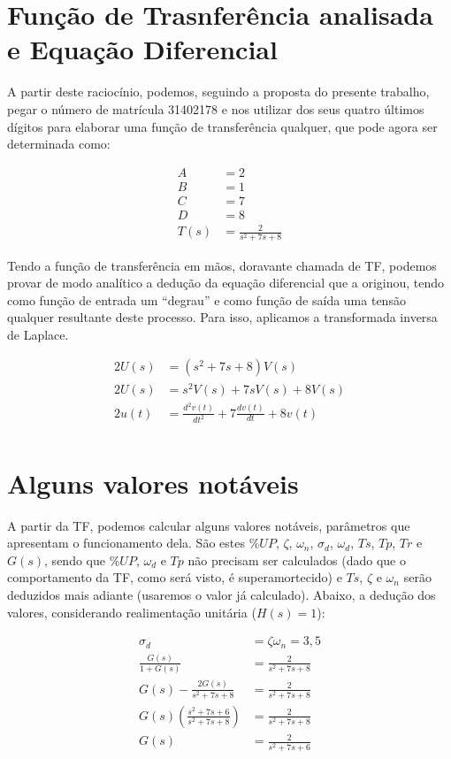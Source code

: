 \documentclass[
	article,			%
	11pt,				%
	oneside,			%
	a4paper,			%
	english,			%
	brazil,				%
	sumario=tradicional
	]{abntex2}
\begin{document}
\section{Função de Trasnferência analisada e Equação Diferencial}

A partir deste raciocínio, podemos, seguindo a proposta do presente trabalho, pegar o número
de matrícula 31402178 e nos utilizar dos seus quatro últimos dígitos para elaborar uma
função de transferência qualquer, que pode agora ser determinada como:

\begin{align*}
  A &= 2 \\
  B &= 1 \\
  C &= 7 \\
  D &= 8 \\
  T(s) &= \frac{2}{s^2 + 7 s + 8}
\end{align*}

Tendo a função de transferência em mãos, doravante chamada de TF, podemos provar
de modo analítico a dedução da equação diferencial que a originou, tendo como
função de entrada um ``degrau'' e como função de saída uma tensão qualquer resultante
deste processo. Para isso, aplicamos a transformada inversa de Laplace.

\begin{align*}
  2U(s) &= (s^2 + 7s + 8)V(s) \\
  2U(s) &= s^2 V(s) + 7sV(s) + 8V(s) \\
  2u(t) &= \frac{d^2 v(t)}{dt^2} + 7\frac{d v(t)}{dt} + 8v(t) \\
\end{align*}

\section{Alguns valores notáveis}

A partir da TF, podemos calcular alguns valores notáveis, parâmetros que apresentam o funcionamento dela. São estes ${\%UP}$, ${\zeta}$, ${\omega_n}$, ${\sigma_d}$, ${\omega_d}$, ${Ts}$, ${Tp}$, ${Tr}$ e ${G(s)}$, sendo que ${\%UP}$, ${\omega_d}$ e ${Tp}$ não precisam ser calculados (dado que o comportamento da TF, como será visto, é superamortecido) e ${Ts}$, ${\zeta}$ e ${\omega_n}$ serão deduzidos mais adiante (usaremos o valor já calculado). Abaixo, a dedução dos valores, considerando realimentação unitária (${H(s) = 1}$):

\begin{align*}
  \sigma_d &= \zeta\omega_n = 3,5 \\
  \frac{G(s)}{1 + G(s)} &= \frac{2}{s^2 + 7s + 8} \\
  G(s) - \frac{2G(s)}{s^2 + 7s + 8} &= \frac{2}{s^2 + 7s + 8} \\
  G(s)(\frac{s^2 + 7s + 6}{s^2 + 7s + 8}) &= \frac{2}{s^2 + 7s + 8} \\
  G(s) &= \frac{2}{s^2 + 7s + 6}
\end{align*}
\end{document}
